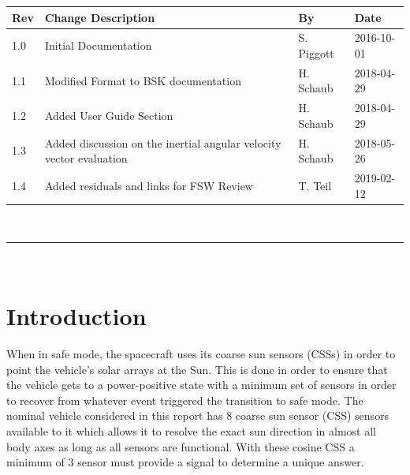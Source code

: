 \documentclass[]{BasiliskReportMemo}
\begin{document}
\makeCover

%
%
\pagestyle{empty}
{\renewcommand{\arraystretch}{2}
\noindent
\begin{longtable}{|p{0.5in}|p{3.5in}|p{1.07in}|p{0.9in}|}
\hline
{\bfseries Rev} & {\bfseries Change Description} & {\bfseries By}& {\bfseries Date} \\
\hline
1.0 & Initial Documentation & S. Piggott & 2016-10-01\\
\hline
1.1 & Modified Format to BSK documentation & H. Schaub & 2018-04-29\\
\hline
1.2 & Added User Guide Section & H. Schaub & 2018-04-29\\
\hline
1.3 & Added discussion on the inertial angular velocity vector evaluation & H. Schaub & 2018-05-26\\
\hline
1.4 & Added residuals and links for FSW Review & T. Teil & 2019-02-12\\
\hline

\end{longtable}
}



\newpage
\setcounter{page}{1}
\pagestyle{fancy}

\tableofcontents %
~\\ \hrule ~\\ %




\section{Introduction}
When in safe mode, the spacecraft uses its coarse sun sensors (CSSs) in order to 
point the vehicle's solar arrays at the Sun.  This is done in order to ensure 
that the vehicle gets to a power-positive state with a minimum set of sensors 
in order to recover from whatever event triggered the transition to safe mode.  
The nominal vehicle considered in this report has 8 coarse sun sensor (CSS) sensors available to it 
which allows it to resolve the exact sun direction in almost all body axes as 
long as all sensors are functional.  With these cosine CSS a minimum of 3 sensor must provide a signal to determine a unique answer.
\end{document}
